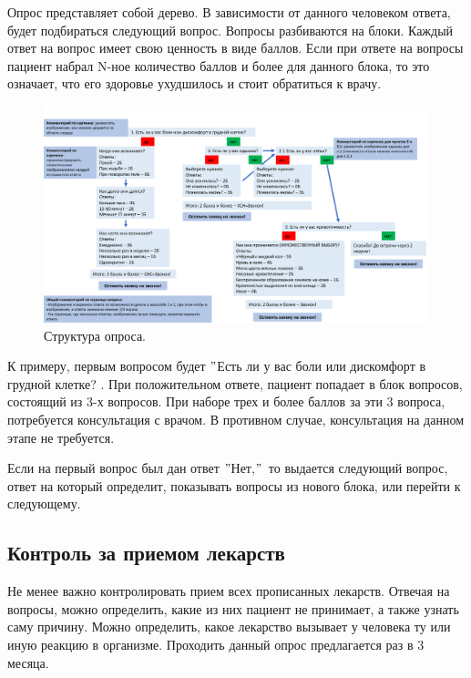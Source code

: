 \documentclass[a4paper,12pt]{article}
\begin{document}
    Опрос представляет собой дерево.
    В зависимости от данного человеком ответа, будет подбираться следующий вопрос.
    Вопросы разбиваются на блоки.
    Каждый ответ на вопрос имеет свою ценность в виде баллов.
    Если при ответе на вопросы пациент набрал N-ное количество баллов и более для данного блока, то это означает, что его здоровье ухудшилось и стоит обратиться к врачу.

    \begin{figure}[h]
        \includegraphics[scale=0.175]{images/presentation/1cbc101521d4d97c799189ce193d279d-0}
        \caption{Структура опроса.}\label{fig:figure}
    \end{figure}

    К примеру, первым вопросом будет \("\)Есть ли у вас боли или дискомфорт в грудной клетке?
    .
    При положительном ответе, пациент попадает в блок вопросов, состоящий из 3-х вопросов.
    При наборе трех и более баллов за эти 3 вопроса, потребуется консультация с врачом.
    В противном случае, консультация на данном этапе не требуется. \par
    Если на первый вопрос был дан ответ \("\)Нет,\("\)\, то выдается следующий вопрос, ответ на который определит, показывать вопросы из нового блока, или перейти к следующему.

    \subsection{Контроль за приемом лекарств}\label{subsec:---}

    Не менее важно контролировать прием всех прописанных лекарств.
    Отвечая на вопросы, можно определить, какие из них пациент не принимает, а также узнать саму причину.
    Можно определить, какое лекарство вызывает у человека ту или иную реакцию в организме.
    Проходить данный опрос предлагается раз в 3 месяца.
\end{document}
